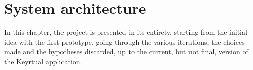 \chapter{System architecture}\label{ch:system-architecture}

In this chapter, the project is presented in its entirety, starting from the initial idea with the first prototype,
going through the various iterations, the choices made and the hypotheses discarded, up to the current,
but not final, version of the Keyrtual application.








